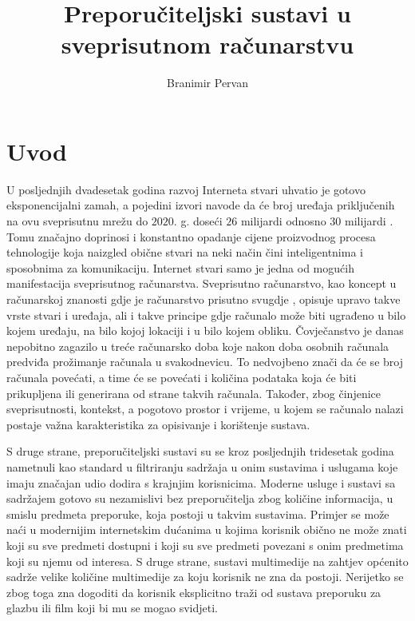 \documentclass[times, utf8, diplomski, numeric]{fer}
\begin{document}
\title{Preporučiteljski sustavi u sveprisutnom računarstvu}
\author{Branimir Pervan}
\maketitle

\izvornik


\tableofcontents

\chapter{Uvod}
U posljednjih dvadesetak godina razvoj Interneta stvari  uhvatio je gotovo eksponencijalni zamah, a pojedini izvori navode da
će broj uređaja priključenih na ovu sveprisutnu mrežu do $2020$. g. doseći $26$
milijardi \cite{gartner2013Iot} odnosno $30$ milijardi \cite{ABI2013Iot}. Tomu
značajno doprinosi i konstantno opadanje cijene proizvodnog procesa tehnologije
koja naizgled obične stvari na neki način čini inteligentnima i sposobnima za
komunikaciju. Internet stvari samo je jedna od mogućih manifestacija
sveprisutnog računarstva. Sveprisutno računarstvo, kao koncept u računarskoj
znanosti gdje je računarstvo prisutno svugdje \cite{theComputerWeiser}, opisuje
upravo takve vrste stvari i uređaja, ali i takve principe gdje računalo može
biti ugrađeno u bilo kojem uređaju, na bilo kojoj lokaciji i u bilo kojem
obliku. Čovječanstvo je danas nepobitno zagazilo u treće računarsko doba koje
nakon doba osobnih računala predviđa prožimanje računala u svakodnevicu. To
nedvojbeno znači da će se broj računala povećati, a time će se povećati i
količina podataka koja će biti prikupljena ili generirana od strane takvih
računala. Također, zbog činjenice sveprisutnosti, kontekst, a pogotovo prostor i
vrijeme, u kojem se računalo nalazi postaje važna karakteristika za opisivanje i
korištenje sustava.

S druge strane, preporučiteljski sustavi su se kroz posljednjih tridesetak
godina nametnuli kao standard u filtriranju sadržaja u onim sustavima i uslugama
koje imaju značajan udio dodira s krajnjim korisnicima. Moderne usluge i sustavi
sa sadržajem gotovo su nezamislivi bez preporučitelja zbog količine informacija,
u smislu predmeta preporuke, koja postoji u takvim sustavima. Primjer se može
naći u modernijim internetskim dućanima u kojima korisnik obično ne može znati
koji su sve predmeti dostupni i koji su sve predmeti povezani s onim predmetima
koji su njemu od interesa. S druge strane, sustavi multimedije na zahtjev
 općenito sadrže velike količine multimedije za koju
korisnik ne zna da postoji. Nerijetko se zbog toga zna dogoditi da korisnik
eksplicitno traži od sustava preporuku za glazbu ili film koji bi mu se mogao
svidjeti.
\end{document}
